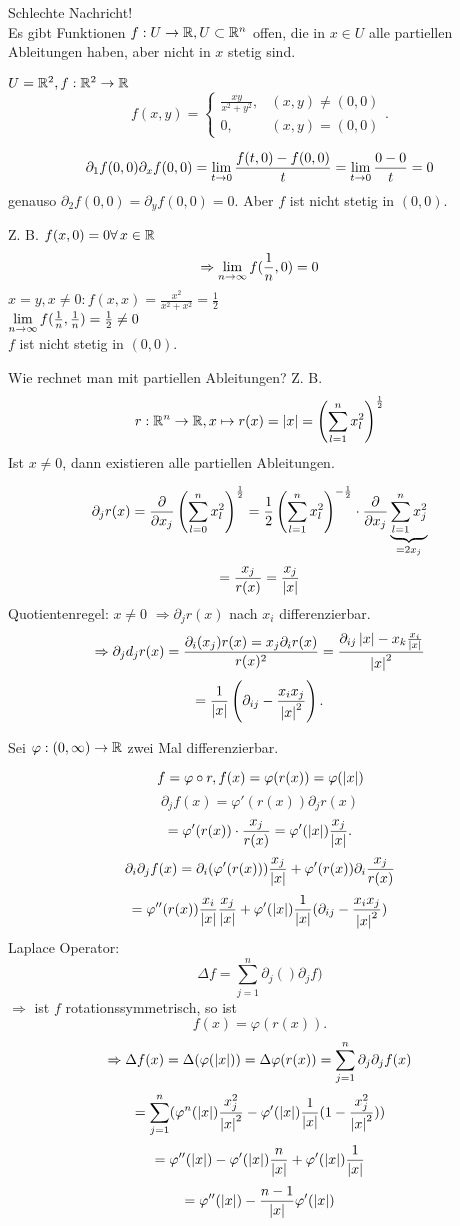 \documentclass[../ana2.tex]{subfiles}
\begin{document}
Schlechte Nachricht!\\
Es gibt Funktionen \( f:U\rightarrow \mathbb{R}, U \subset \mathbb{R}^n \) offen, 
die in \( x\in U \) alle partiellen Ableitungen haben, 
aber nicht in \( x \) stetig sind.
\begin{bsp}
    \( U = \mathbb{R}^2, f:\mathbb{R}^2\rightarrow \mathbb{R} \)
    \[ f(x,y) = \begin{cases}
        \frac{xy}{x^2 + y^2}, &(x,y) \neq (0,0)\\
        0, &(x,y) = (0,0)
    \end{cases}. \]

    \[ \partial_1 f(0,0) \partial_x f(0,0) 
    = \lim\limits_{t\rightarrow{}0} \frac{f(t,0) - f(0,0)}{t} 
    = \lim\limits_{t\rightarrow{}0} \frac{0 - 0}{t} = 0 \]
    genauso \( \partial_2 f(0,0) = \partial_y f(0,0) = 0 \).
    Aber \(f\) ist nicht stetig in \( (0,0) \).

    Z. B. \( f(x,0) = 0 \forall x \in \R \)
    \[ \Rightarrow \lim\limits_{n\rightarrow\infty} f(\frac{1}{n},0) = 0 \]
    \( x=y, x \neq 0: f(x,x) = \frac{x^2}{x^2 + x^2} = \frac{1}{2} \) \\
    \( \lim\limits_{n\rightarrow\infty} f(\frac{1}{n}, \frac{1}{n}) = \frac{1}{2} \neq 0 \) \\
    \( f \) ist nicht stetig in \( (0,0) \).
\end{bsp}
Wie rechnet man mit partiellen Ableitungen?
Z. B. \[ r:\mathbb{R}^n\rightarrow \mathbb{R}, x \mapsto r(x) = \left|x\right| 
= \left( \sum_{l=1}^n x_l^2 \right)^{\frac{1}{2}} \]
Ist \( x \neq 0 \), dann existieren alle partiellen Ableitungen.

\[ \partial_j r(x) = \frac{\partial}{\partial x_j} 
\left( \sum_{l=0}^n x_l^2 \right)^{\frac{1}{2}} 
= \frac{1}{2} \left( \sum_{l=1}^n x_l^2 \right)^{-\frac{1}{2}} 
\cdot \frac{\partial}{\partial x_j} \underbrace{\sum_{l=1}^n x_j^2}_{=2x_j} \]
\[ = \frac{x_j}{r(x)} = \frac{x_j}{\left|x\right|} \]
Quotientenregel: \( x \neq 0 \)
\( \Rightarrow \partial_j r(x) \) nach \( x_i \) 
differenzierbar.
\[ \Rightarrow \partial_j d_j r(x) 
= \frac{ \partial_i(x_j) r(x) = x_j \partial_i r(x) }{r(x)^2} 
= \frac{\partial_{ij} \left|x\right| - x_k \frac{x_i}{\left|x\right|}}{\left|x\right|^2} \]
\[ = \frac{1}{\left|x\right|} \left( \partial_{ij} - \frac{x_i x_j}{\left|x\right|^2} \right). \]

Sei \( \varphi:(0,\infty)\rightarrow \mathbb{R} \) zwei Mal differenzierbar. 

\[ f = \varphi \circ r, f(x) = \varphi(r(x)) = \varphi(\left|x\right|) \]
\[ \partial_j f(x) = \varphi'(r(x)) \partial_j r(x) \]
\[ = \varphi'(r(x)) \cdot \frac{x_j}{r(x)} 
= \varphi'(\left|x\right|) \frac{x_j}{\left|x\right|}. \]
\[ \partial_i \partial_j f(x) = \partial_i(\varphi'(r(x))) 
\frac{x_j}{\left|x\right|} + \varphi'(r(x)) \partial_i \frac{x_j}{r(x)} \]
\[ = \varphi''(r(x)) \frac{x_i}{\left|x\right|} \frac{x_j}{\left|x\right|} 
+ \varphi'(\left|x\right|) \frac{1}{\left|x\right|} (\partial_{ij} - \frac{x_i x_j}{\left|x\right|^2}) \]
Laplace Operator:
\[ \Delta f = \sum_{j=1}^n \partial_j ()\partial_j f) \]
\( \Rightarrow \) ist \(f\) rotationssymmetrisch, so ist 
\[ f(x) = \varphi(r(x)). \]
\[ \Rightarrow \Delta f(x) = \Delta(\varphi(\left|x\right|)) 
= \Delta \varphi(r(x)) = \sum_{j=1}^n 
\partial_j \partial_j f(x) \]
\[ = \sum_{j=1}^n (\varphi^n(\left|x\right|) \frac{x_j^2}{\left|x\right|^2} 
- \varphi'(\left|x\right|) \frac{1}{\left|x\right|} (1 - \frac{x_j^2}{\left|x\right|^2}) ) \]
\[ = \varphi''(\left|x\right|) - \varphi'(\left|x\right|) \frac{n}{\left|x\right|} 
+ \varphi'(\left|x\right|) \frac{1}{\left|x\right|} \]
\[ = \varphi''(\left|x\right|) - \frac{n-1}{\left|x\right|} \varphi'(\left|x\right|) \]
\end{document}
